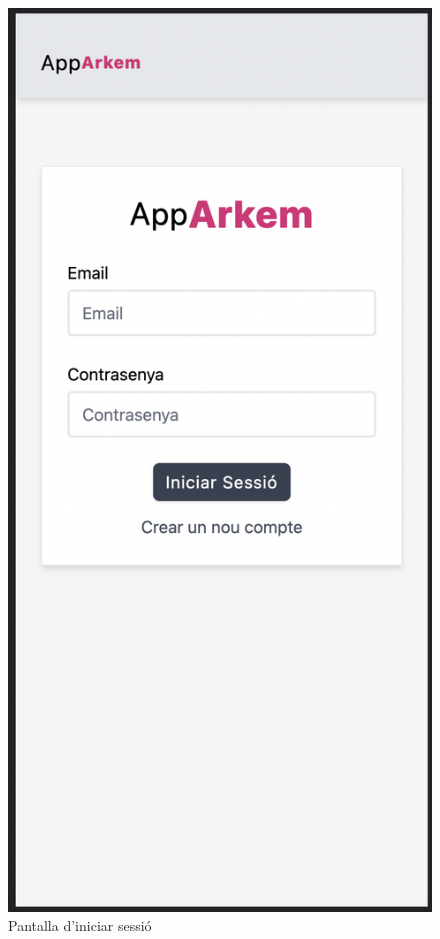 \begin{figure}[H]
    \begin{center}
        \includegraphics[scale=0.50]{Fotos/pantalla0_login.png}
    \end{center}
    \caption{Pantalla d'iniciar sessió}
    \label{fig:login_photo}
\end{figure}

